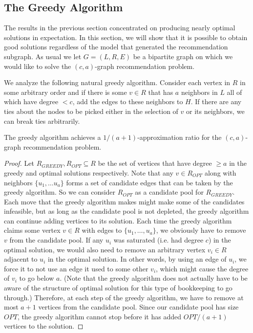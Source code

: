 \subsection{The Greedy Algorithm}
\label{greedy}
The results in the previous section concentrated on producing nearly
optimal solutions in expectation. In this section, we will show that
it is possible to obtain good solutions regardless of the model that
generated the recommendation subgraph. As usual we let $G=(L,R,E)$ be a
bipartite graph on which we would like to solve the $(c,a)$-graph
recommendation problem. \vs

We analyze the following natural greedy algorithm. Consider each vertex
in $R$ in some arbitrary order and if there is some $v \in R$ that has
$a$ neighbors in $L$ all of which have degree $< c$, add the edges to
these neighbors to $H$. If there are any ties about the nodes to be
picked either in the selection of $v$ or its neighbors, we can break
ties arbitrarily. 

\begin{thm}
The greedy algorithm achieves a $1/(a+1)$-approximation ratio for the $(c,a)$-graph
recommendation problem.
\end{thm}
\begin{proof}
Let $R_{GREEDY}, R_{OPT}\subseteq R$ be the set of vertices that have
degree $\geq a$ in the greedy and optimal solutions respectively. Note
that any $v \in R_{OPT}$ along with neighbors $\{u_1,\ldots u_a\}$
forms a set of candidate edges that can be taken by the greedy
algorithm. So we can consider $R_{OPT}$ as a candidate pool for
$R_{GREEDY}$. Each move that the greedy algorithm makes might make
some of the candidates infeasible, but as long as the candidate pool
is not depleted, the greedy algorithm can continue adding vertices to
its solution. Each time the greedy algorithm claims some vertex $v\in
R$ with edges to $\{u_1,\ldots, u_a\}$, we obviously have to
remove $v$ from the candidate pool. If any $u_i$ was saturated
(i.e. had degree $c$) in the optimal solution, we would also need to
remove an arbitrary vertex $v_i\in R$ adjacent to $u_i$ in the optimal
solution. In other words, by using an edge of $u_i$, we force it to
not use an edge it used to some other $v_i$, which might cause the
degree of $v_i$ to go below $a$. (Note that the greedy algorithm does
not actually have to be aware of the structure of optimal solution for
this type of bookkeeping to go through.) Therefore, at each step of
the greedy algorithm, we have to remove at most $a+1$ vertices from
the candidate pool. Since our candidate pool has size $OPT$, the
greedy algorithm cannot stop before it has added $OPT/(a+1)$
vertices to the solution.
\end{proof}

